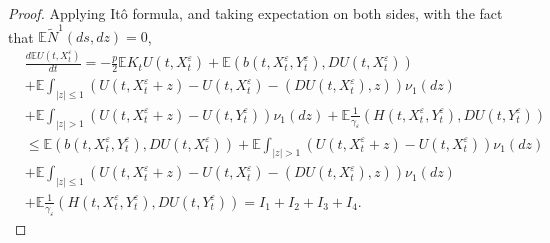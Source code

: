 \documentclass[11pt,reqno]{amsart}
\numberwithin{equation}{section}
\begin{document}
\begin{proof}
	Applying It\^{o} formula, and taking expectation on both sides, with the fact that $\mathbb{E}\tilde{N}^{1}(ds,dz)=0$,
	\begin{equation}\label{3.9}
		\begin{split}
			&	\frac{d\mathbb{E}U(t,X_{t}^{\varepsilon})}{dt}=-\frac{p}{2}\mathbb{E}K_{t}U(t,X_{t}^{\varepsilon})+\mathbb{E}( b(t,X_{t}^{\varepsilon},Y_{t}^{\varepsilon}),DU(t,X_{t}^{\varepsilon})) \\
			&+\mathbb{E} \int_{|z|\leq 1}\left( U(t,X_{t}^{\varepsilon}+z)-U(t,X_{t}^{\varepsilon})-( DU(t,X_{t}^{\varepsilon}), z)  \right) \nu_{1}(dz)\\
			&+\mathbb{E} \int_{|z|> 1}\left( U(t,X_{t}^{\varepsilon}+z)-U(t,Y_{t}^{\varepsilon}) \right) \nu_{1}(dz)+\mathbb{E} \frac{1}{\gamma_{\varepsilon}}( H(t,X_{t}^{\varepsilon},Y_{t}^{\varepsilon}),DU(t,Y_{t}^{\varepsilon})) \\
			&\leq \mathbb{E} (b(t,X_{t}^{\varepsilon},Y_{t}^{\varepsilon}),DU(t,X_{t}^{\varepsilon})) +\mathbb{E} \int_{|z|> 1}\left( U(t,X_{t}^{\varepsilon}+z)-U(t,X_{t}^{\varepsilon}) \right) \nu_{1}(dz)\\
			&+\mathbb{E} \int_{|z|\leq 1}\left( U(t,X_{t}^{\varepsilon}+z)-U(t,X_{t}^{\varepsilon})- (DU(t,X_{t}^{\varepsilon}), z)  \right) \nu_{1}(dz)\\
			&+\mathbb{E} \frac{1}{\gamma_{\varepsilon}} (H(t,X_{t}^{\varepsilon},Y_{t}^{\varepsilon}),DU(t,Y_{t}^{\varepsilon}))=I_{1}+I_{2}+I_{3}+I_{4}.
		\end{split}
	\end{equation}
	

\end{proof}
\end{document}
